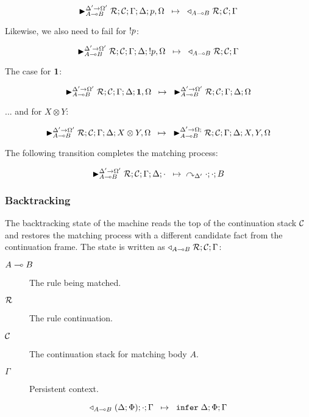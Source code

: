 \[
\trans{\matstate{A \lolli B}{\rulestk}{\lstack{C}}{\Gamma}{\Delta}{p,
   \Omega}{\Delta' \rightarrow \Omega'}}
{\contstate{A \lolli B}{\rulestk}{\lstack{C}}{\Gamma}}
\]

Likewise, we also need to fail for $\bang p$:

\[
\trans{\matstate{A \lolli B}{\rulestk}{\lstack{C}}{\Gamma}{\Delta}{\bang p,
   \Omega}{\Delta' \rightarrow \Omega'}}
{\contstate{A \lolli B}{\rulestk}{\lstack{C}}{\Gamma}}
\]

The case for $\one$:

\[
\trans{\matstate{A \lolli B}{\rulestk}{\lstack{C}}{\Gamma}{\Delta}{\one,
   \Omega}{\Delta' \rightarrow \Omega'}}
{\matstate{A \lolli B}{\rulestk}{\lstack{C}}{\Gamma}{\Delta}{\Omega}{\Delta'
   \rightarrow \Omega'}}
\]

... and for $X \otimes Y$:

\[
\trans{\matstate{A \lolli B}{\rulestk}{\lstack{C}}{\Gamma}{\Delta}{X \otimes Y,
   \Omega}{\Delta' \rightarrow \Omega'}}
{\matstate{A \lolli B}{\rulestk}{\lstack{C}}{\Gamma}{\Delta}{X, Y,
   \Omega}{\Delta' \rightarrow \Omega;}}
\]

The following transition completes the matching process:

\[
\trans{\matstate{A \lolli
   B}{\rulestk}{\lstack{C}}{\Gamma}{\Delta}{\cdot}{\Delta' \rightarrow \Omega'}}
{
   \derstate{\Delta'}{\cdot}{\cdot}{B}
}
\]

\subsubsection{Backtracking}

The backtracking state of the machine reads the top of the continuation stack
$\lstack{C}$ and restores the matching process with a different candidate fact
from the continuation frame. The state is written as $\contstate{A \lolli
   B}{\rulestk}{\lstack{C}}{\Gamma}$:

\begin{description}
   \item[$A \lolli B$] The rule being matched.
   \item[$\rulestk$] The rule continuation.
   \item[$\lstack{C}$] The continuation stack for matching body $A$.
   \item[$\Gamma$] Persistent context.
\end{description}

\[
\trans{\contstate{A \lolli B}{(\Delta; \Phi)}{\cdot}{\Gamma}}
   {\dostate{\Delta}{\Phi}{\Gamma}}
\]

